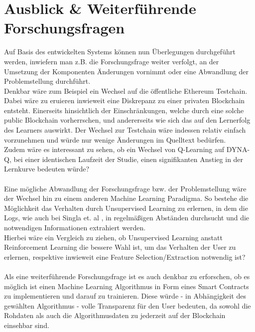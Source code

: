 \section{Ausblick \& Weiterf\"uhrende Forschungsfragen}
\label{sec:weiterforschen}
Auf Basis des entwickelten Systems können nun Überlegungen durchgeführt werden, inwiefern man z.B. die Forschungsfrage weiter verfolgt, an der Umsetzung der Komponenten Änderungen vornimmt oder eine Abwandlung der Problemstellung durchführt. \\
Denkbar wäre zum Beispiel ein Wechsel auf die öffentliche Ethereum Testchain. Dabei wäre zu eruieren inwieweit eine Diskrepanz zu einer privaten Blockchain entsteht. Einerseits hinsichtlich der Einschränkungen, welche durch eine solche public Blockchain vorherrschen, und andererseits wie sich das auf den Lernerfolg des Learners auswirkt. Der Wechsel zur Testchain wäre indessen relativ einfach vorzunehmen und würde nur wenige Änderungen im Quelltext bedürfen. \\ Zudem wäre es interessant zu sehen, ob ein Wechsel von Q-Learning auf DYNA-Q, bei einer identischen Laufzeit der Studie, einen signifikanten Anstieg in der Lernkurve bedeuten würde?\\\\
Eine mögliche Abwandlung der Forschungsfrage bzw. der Problemstellung wäre der Wechsel hin zu einem anderen Machine Learning Paradigma. So bestehe die Möglichkeit das Verhalten durch Unsupervised Learning zu erlernen, in dem die Logs, wie auch bei Singla et. al \cite{Singla:MLSDPUB}, in regelmäßigen Abständen durchsucht und die notwendigen Informationen extrahiert werden. \\
Hierbei wäre ein Vergleich zu ziehen, ob Unsupervised Learning anstatt Reinforcement Learning die bessere Wahl ist, um das Verhalten der User zu erlernen, respektive inwieweit eine Feature Selection/Extraction notwendig ist?\\\\
Als eine weiterführende Forschungsfrage ist es auch denkbar zu erforschen, ob es möglich ist einen Machine Learning Algorithmus in Form eines Smart Contracts zu implementieren und darauf zu trainieren. Diese  würde - in Abhängigkeit des gewählten Algorithmus - volle Transparenz für den User bedeuten, da sowohl die Rohdaten als auch die Algorithmusdaten zu jederzeit auf der Blockchain einsehbar sind.